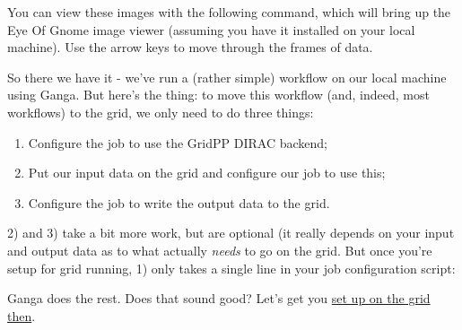 You can view these images with the following command, which will bring
up the Eye Of Gnome image viewer (assuming you have it installed on your
local machine). Use the arrow keys to move through the frames of data.

\begin{Shaded}
\begin{Highlighting}[]
\NormalTok{$ } \KeywordTok{&}
\end{Highlighting}
\end{Shaded}

So there we have it - we've run a (rather simple) workflow on our local
machine using Ganga. But here's the thing: to move this workflow (and,
indeed, most workflows) to the grid, we only need to do three things:

\begin{enumerate}
\def\labelenumi{\arabic{enumi}.}
\tightlist
\item
  Configure the job to use the GridPP DIRAC backend;
\item
  Put our input data on the grid and configure our job to use this;
\item
  Configure the job to write the output data to the grid.
\end{enumerate}

2) and 3) take a bit more work, but are optional (it really depends on
your input and output data as to what actually \emph{needs} to go on
the grid. But once you're setup for grid running, 1) only takes a
single line in your job configuration script:

\begin{Shaded}
\begin{Highlighting}[]
\end{Highlighting}
\end{Shaded}

Ganga does the rest. Does that sound good? Let's get you
\hyperref[sec:onthegrid]{set up on the grid then}.




